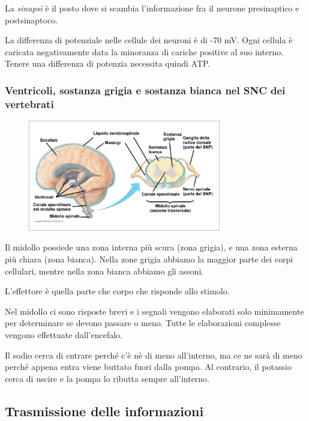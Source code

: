 \documentclass[a4paper]{article}
\begin{document}
La \textit{sinapsi} è il posto dove si scambia l'informazione fra il neurone presinaptico e postsinaptoco.

La differenza di potenziale nelle cellule dei neuroni è di -70 mV. Ogni cellula è caricata
negativamente data la minoranza di cariche positive al suo interno.
Tenere una differenza di potenzia necessita quindi ATP.

\subsubsection{Ventricoli, sostanza grigia e sostanza bianca nel SNC dei vertebrati}

\begin{figure}[ht]
    \centering
    \includegraphics[width=0.75\textwidth]{./sostanza_grigia_bianca.png}
\end{figure}

Il midollo possiede una zona interna più scura (zona grigia), e una zona esterna più chiara
(zona bianca). Nella zone grigia abbiamo la maggior parte dei corpi cellulari,
mentre nella zona bianca abbiamo gli assoni.

L'effettore è quella parte che corpo che risponde allo stimolo.

Nel midollo ci sono risposte brevi e i segnali vengono elaborati solo minimamente per determinare se devono passare o meno.
Tutte le elaborazioni complesse vengono effettuate dall'encefalo.

Il sodio cerca di entrare perché c'è nè di meno all'interno, ma ce ne sarà di meno perché appena entra
viene buttato fuori dalla pompa.
Al contrario, il potassio cerca di uscire e la pompa lo ributta sempre all'interno.


\subsection{Trasmissione delle informazioni}
\end{document}
